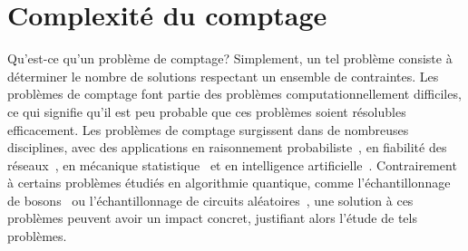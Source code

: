 \chapter{Complexité du comptage}
\label{cha:complexite-du-comptage}

Qu'est-ce qu'un problème de comptage? Simplement, un tel problème consiste à déterminer le nombre de solutions respectant un ensemble de contraintes. Les problèmes de comptage font partie des problèmes computationnellement difficiles, ce qui signifie qu'il est peu probable que ces problèmes soient résolubles efficacement. Les problèmes de comptage surgissent dans de nombreuses disciplines, avec des applications en raisonnement probabiliste~\cite{rothHardnessApproximateReasoning1996, sangPerformingBayesianInference2005, abramsonHailfinderBayesianSystem1996}, en fiabilité des réseaux~\cite{valiantComplexityEnumerationReliability1979, duenas-osorioCountingBasedReliabilityEstimation2017}, en mécanique statistique~\cite{jerrumPolynomialtimeApproximationAlgorithms1993} et en intelligence artificielle~\cite{balutaQuantitativeVerificationNeural2019}. Contrairement à certains problèmes étudiés en algorithmie quantique, comme l'échantillonnage de bosons~\cite{aaronsonComputationalComplexityLinear2011} ou l'échantillonnage de circuits aléatoires~\cite{boulandComplexityVerificationQuantum2019}, une solution à ces problèmes peuvent avoir un impact concret, justifiant alors l'étude de tels problèmes.

